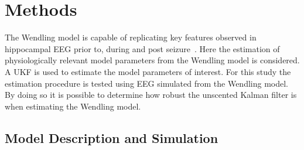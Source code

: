 \section{Methods}

The Wendling model is capable of replicating key features observed in hippocampal EEG prior to, during and post seizure~\citep{wendling2002epileptic,wendling2005interictal}. Here the estimation of physiologically relevant model parameters from the Wendling model is considered. A UKF is used to estimate the model parameters of interest. For this study the estimation procedure is tested using EEG simulated from the Wendling model. By doing so it is possible to determine how robust the unscented Kalman filter is when estimating the Wendling model.

\subsection{Model Description and Simulation} %

